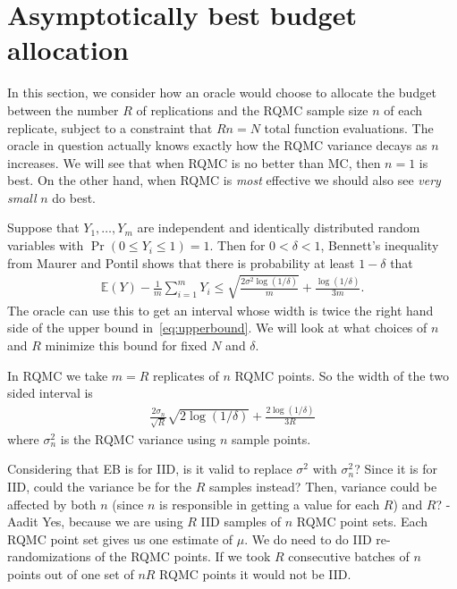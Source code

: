 \documentclass{article}
\newcommand{\art}[1]{\begingroup\color{blue}#1\endgroup}
\newcommand{\aadit}[1]{\begingroup\color{orange}#1\endgroup}
\renewcommand{\le}{\leqslant}
\newcommand{\e}{\mathbb{E}}
\begin{document}
\section{Asymptotically best budget allocation}

In this section, we consider how an oracle would choose
to allocate the budget between the number $R$ of replications
and the RQMC sample size $n$ of each replicate, subject to
a constraint that $Rn=N$ total function evaluations.  The
oracle in question actually knows exactly how the RQMC
variance decays as $n$ increases.  We will see that
when RQMC is no better than MC, then $n=1$ is best.
On the other hand, when RQMC is {\sl most} effective we should 
also see {\sl very small} $n$ do best.

Suppose that $Y_1,\dots,Y_m$ are independent and identically
distributed random variables with $\Pr(0\le Y_i\le 1)=1$.
Then for $0<\delta<1$,
Bennett's inequality from Maurer and Pontil \cite{maurer2009empirical} shows that
there is probability at least $1-\delta$  that
\begin{align}\label{eq:upperbound}
\e(Y) -   \frac1m\sum_{i=1}^mY_i \le \sqrt{\frac{2\sigma^2\log(1/\delta)}m}
+ \frac{\log(1/\delta)}{3m}.
\end{align}
The oracle can use this to get an interval whose width is
twice the right hand side of the upper bound in~\eqref{eq:upperbound}.
We will look at what choices of $n$ and $R$ minimize this bound for fixed $N$ and $\delta$.

In RQMC we take $m=R$ replicates of $n$ RQMC points.
So the width of the two sided interval is 
\begin{align}\label{eq:thewidth}
\frac{2\sigma_n}{\sqrt{R}}\sqrt{2\log(1/\delta)}  + \frac{2\log(1/\delta)}{3R}
\end{align}
where $\sigma^2_n$ is the RQMC variance using $n$ sample  points.

\aadit{Considering that EB is for IID, is it valid to replace $\sigma^2$ with $\sigma^2_n$? Since it is for IID, could the variance be for the $R$ samples instead? Then, variance could be affected by both $n$ (since $n$ is responsible in getting a value for each $R$) and $R$? - Aadit}
\art{Yes, because we are using $R$ IID samples of $n$ RQMC point sets.  Each RQMC point set gives us one estimate of $\mu$. We do need to do IID re-randomizations of the RQMC points.  If we took $R$ consecutive batches of $n$ points out of one set of $nR$ RQMC points it would not be IID.}
\end{document}
